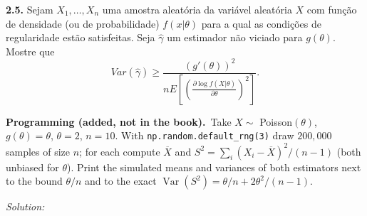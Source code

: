 \documentclass[11pt,a4paper]{article}
\newif\ifsolucoes
\newcommand{\espacoresol}{4.5cm}   %
\numberwithin{equation}{questao}   %
\newcommand{\programacao}{\par\smallskip\noindent\textbf{Programming (added, not in the book).}~}
\newcommand{\resolespaco}{\ifsolucoes\else\par\textit{Solution:}\vspace{\espacoresol}\par\fi}
\newcommand{\Var}{\operatorname{Var}}
\newcommand{\1}{\mathbf{1}}
\begin{document}
\begin{otherlanguage}{brazil}
\textbf{2.5.} Sejam $X_1,\dots,X_n$ uma amostra aleatória da variável aleatória $X$ com função de
densidade (ou de probabilidade) $f(x|\theta)$ para a qual as condições de regularidade estão
satisfeitas. Seja $\hat\gamma$ um estimador não viciado para $g(\theta)$. Mostre que
\[
Var(\hat\gamma)\ge\frac{(g'(\theta))^2}{nE\left[\left(\frac{\partial\log f(X|\theta)}{\partial\theta}\right)^2\right]}.
\]
\end{otherlanguage}
\programacao Take $X\sim$ Poisson$(\theta)$, $g(\theta)=\theta$, $\theta=2$, $n=10$. With
\texttt{np.random.default\_rng(3)} draw $200{,}000$ samples of size $n$; for each compute
$\overline X$ and $S^2=\sum_i(X_i-\overline X)^2/(n-1)$ (both unbiased for $\theta$). Print the
simulated means and variances of both estimators next to the bound $\theta/n$ and to the exact
$\Var(S^2)=\theta/n+2\theta^2/(n-1)$.
\resolespaco
\end{document}
